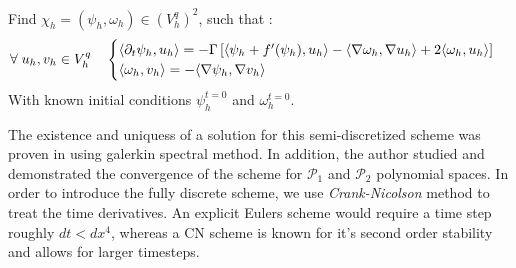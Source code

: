 \documentclass{article}
\begin{document}
\begin{mybox}{}
Find $\chi_h=(\psi_h,\omega_h)\in (V^q_h)^2$, such that :
\begin{equation}
   \forall \; u_h, v_h \in V^q_h  \quad   \begin{cases}
      \langle{\partial_t\psi_h},{u_h}\rangle=  -\Gamma \left[ \langle{\psi_h + f'(\psi_h)},{u_h}\rangle -\langle{\nabla \omega_h},{ \nabla u_h}\rangle +2 \langle{\omega_h},{u_h}\rangle  \right] \\
      \langle{\omega_h},{v_h}\rangle = -\langle{\nabla \psi_h},{ \nabla v_h}\rangle 
   \end{cases}
\end{equation}
With known initial conditions $\psi_h^{t=0}$ and $\omega_h^{t=0}$.
\end{mybox}
The existence and uniquess of a solution for this semi-discretized scheme was proven in \cite{qiNumericalAnalysisSecondorder2024} using galerkin spectral method. In addition, the author studied and demonstrated the convergence of the scheme for $\mathcal{P}_1$ and $\mathcal{P}_2$ polynomial spaces.
\newpage
In order to introduce the fully discrete scheme, we use \emph{Crank-Nicolson} method to treat the time derivatives. An explicit Eulers scheme would require a time step roughly $dt<dx^4$, whereas a CN scheme is known for it's second order stability and allows for larger timesteps.
\end{document}
